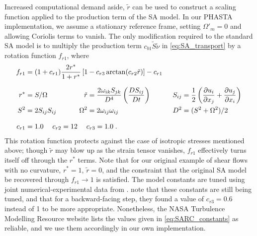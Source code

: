 \documentclass[11pt]{article}
\begin{document}
Increased computational demand aside, $\tilde{r}$ can be used to construct a scaling function applied to the production term of the SA model. In our PHASTA implementation, we assume a stationary reference frame, setting $\Omega'_m = 0$ and allowing Coriolis terms to vanish. The only modification required to the standard SA model is to multiply the production term $c_{b1} \tilde{S} \tilde{\nu}$ in \eqref{eq:SA_transport} by a rotation function $f_{r1}$, where
\begin{align}
	&\begin{aligned}
		\mathllap{f_{r1}} = (1 + c_{r1}) \frac{2 r^*}{1 + r^*} \left[ 1 - c_{r3} \arctan(c_{r2} \tilde{r}) \right] - c_{r1}
		\;
		\label{eq:SARC_rotation_function}
	\end{aligned}\\[0.25cm]
	\phantom{f_{r1}}
	&\begin{aligned}
		\mathllap{r^*} &= S / \Omega
		\; &\qquad
		\tilde{r} &= \frac{2 \omega_{ik} S_{jk}}{D^4} \left( \frac{D S_{ij}}{D t} \right)
		\; &\qquad
		S_{ij} &= \frac{1}{2} \left( \pp{u_i}{x_j} + \pp{u_j}{x_i} \right)
		\; \\
		\mathllap{S^2} &= 2 S_{ij} S_{ij}
		\; &\qquad
		\Omega^2 &= 2 \omega_{ij} \omega_{ij}
		\; &\qquad
		D^2 &= (S^2 + \Omega^2) / 2
		\label{eq:SARC_definitions}
	\end{aligned}\\[0.25cm]
	&\begin{aligned}
		\mathllap{c_{r1}} &= 1.0
		\; \quad
		c_{r2} = 12
		\; \quad
		c_{r3} = 1.0
		\;.
		\label{eq:SARC_constants}
	\end{aligned}
\end{align}
This rotation function protects against the case of isotropic stresses mentioned above; though $\tilde{r}$ may blow up as the strain tensor vanishes, $f_{r1}$ effectively turns itself off through the $r^*$ terms. Note that for our original example of shear flows with no curvature, $r^* = 1$, $\tilde{r} = 0$, and the constraint that the original SA model be recovered through $f_{r1} \rightarrow 1$ is satisfied. The model constants are tuned using joint numerical-experimental data from \citet{dacles1995}. \citet{shur2000} note that these constants are still being tuned, and that for a backward-facing step, they found a value of $c_{r3} = 0.6$ instead of 1 to be more appropriate. Nonetheless, the NASA Turbulence Modelling Resource website lists the values given in \eqref{eq:SARC_constants} as reliable, and we use them accordingly in our own implementation.
\end{document}
